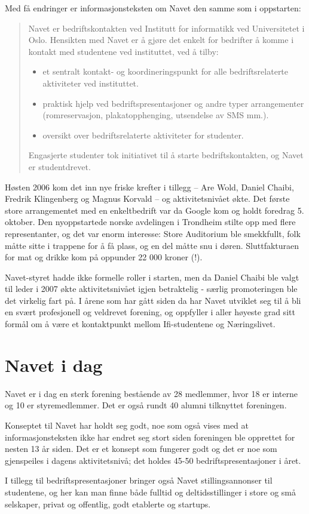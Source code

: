 Med få endringer er informasjonsteksten om Navet den samme som i oppstarten:

\begin{quote}
	Navet er bedriftskontakten ved Institutt for informatikk ved Universitetet i Oslo. Hensikten med Navet er å gjøre det enkelt for bedrifter å komme i kontakt med studentene ved instituttet, ved å tilby:
	
	\begin{itemize}
		\item et sentralt kontakt- og koordineringspunkt for alle bedriftsrelaterte aktiviteter ved instituttet.
		\item praktisk hjelp ved bedriftspresentasjoner og andre typer arrangementer (romreservasjon, plakatopphenging, utsendelse av SMS mm.).
		\item oversikt over bedriftsrelaterte aktiviteter for studenter.
	\end{itemize}
	
	Engasjerte studenter tok initiativet til å starte bedriftskontakten, og Navet er studentdrevet.
\end{quote}

Høsten 2006 kom det inn nye friske krefter i tillegg -- Are Wold, Daniel Chaibi, Fredrik Klingenberg og Magnus Korvald -- og aktivitetsnivået økte. Det første store arrangementet med en enkeltbedrift var da Google kom og holdt foredrag 5. oktober. Den nyoppstartede norske avdelingen i Trondheim stilte opp med flere representanter, og det var enorm interesse: Store Auditorium ble smekkfullt, folk måtte sitte i trappene for å få plass, og en del måtte snu i døren. Sluttfakturaen for mat og drikke kom på oppunder 22 000 kroner (!).

Navet-styret hadde ikke formelle roller i starten, men da Daniel Chaibi ble valgt til leder i 2007 økte aktivitetsnivået igjen betraktelig - særlig promoteringen ble det virkelig fart på. I årene som har gått siden da har Navet utviklet seg til å bli en svært profesjonell og veldrevet forening, og oppfyller i aller høyeste grad sitt formål om å være et kontaktpunkt mellom Ifi-studentene og Næringslivet.

\section{Navet i dag}

\author{Skrevet av Carl-Magnus Lein, nåværende leder}

Navet er i dag en sterk forening bestående av 28 medlemmer, hvor 18 er interne og 10 er styremedlemmer. Det er også rundt 40 alumni tilknyttet foreningen.

Konseptet til Navet har holdt seg godt, noe som også vises med at informasjonsteksten ikke har endret seg stort siden foreningen ble opprettet for nesten 13 år siden. Det er et konsept som fungerer godt og det er noe som gjenspeiles i dagens aktivitetsnivå; det holdes  45-50 bedriftspresentasjoner i året.

I tillegg til bedriftspresentasjoner bringer også Navet stillingsannonser til studentene, og her kan man finne både fulltid og deltidsstillinger i store og små selskaper, privat og offentlig, godt etablerte og startups.
